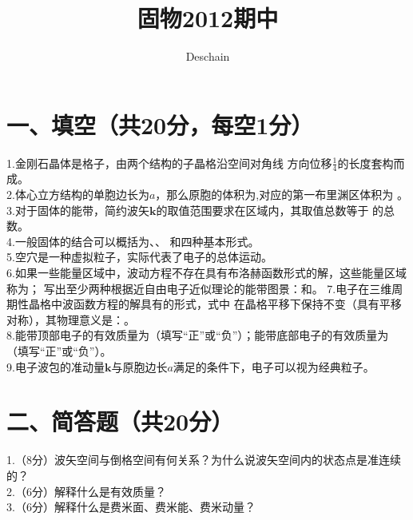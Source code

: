 \documentclass[UTF8]{ctexart}
\title{固物2012期中}
\author{Deschain}
\begin{document}
\maketitle
\section*{\bfseries 一、填空（共20分，每空1分）}
1.金刚石晶体是\uline{\makebox[3em]{}}格子，由两个\uline{\makebox[6em]{}}结构的子晶格沿空间对角线
方向位移$\frac{1}{4}$的长度套构而成。\\
2.体心立方结构的单胞边长为$a$，那么原胞的体积为\uline{\makebox[3em]{}},对应的第一布里渊区体积为
\uline{\makebox[4em]{}}。\\
3.对于固体的能带，简约波矢$\bm{k}$的取值范围要求在\uline{\makebox[9em]{}}区域内，其取值总数等于
\uline{\makebox[3em]{}}的总数。\\
4.一般固体的结合可以概括为\uline{\makebox[6em]{}}、\uline{\makebox[6em]{}}、\uline{\makebox[7em]{}}
和\uline{\makebox[10em]{}}四种基本形式。\\
5.空穴是一种虚拟粒子，实际代表了\uline{\makebox[12em]{}}电子的总体运动。\\
6.如果一些能量区域中，波动方程不存在具有布洛赫函数形式的解，这些能量区域称为\uline{\makebox[3em]{}}；
写出至少两种根据近自由电子近似理论的能带图景：\uline{\makebox[12em]{}}和\uline{\makebox[12em]{}}。
7.电子在三维周期性晶格中波函数方程的解具有\uline{\makebox[12em]{}}的形式，式中\uline{\makebox[4em]{}}
在晶格平移下保持不变（具有平移对称），其物理意义是：\uline{\makebox[25em]{}}。\\
8.能带顶部电子的有效质量为\uline{\makebox[2em]{}}（填写“正”或“负”）；能带底部电子的有效质量为
\uline{\makebox[2em]{}}（填写“正”或“负”）。\\
9.电子波包的准动量$\bm{k}$与原胞边长$a$满足\uline{\makebox[10em]{}}的条件下，电子可以视为经典粒子。\\
\section*{\bfseries 二、简答题（共20分）}
1.（8分）波矢空间与倒格空间有何关系？为什么说波矢空间内的状态点是准连续的？\\
2.（6分）解释什么是有效质量？\\
3.（6分）解释什么是费米面、费米能、费米动量？\\
\end{document}
